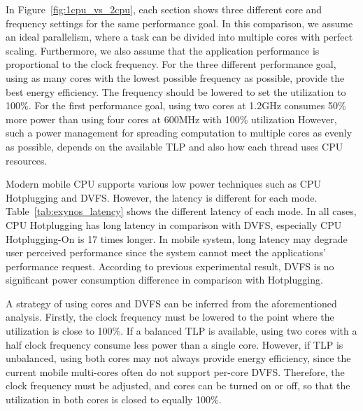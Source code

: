 In Figure~\ref{fig:1cpu_vs_2cpu}, each section shows three different core and frequency settings
for the same performance goal. In this comparison, we assume an ideal parallelism, where
a task can be divided into multiple cores with perfect scaling. Furthermore, we also assume
that the application performance is proportional to the clock frequency.
For the three different performance goal, using as many cores with the lowest possible
frequency as possible, provide the best energy efficiency. The frequency should be 
lowered to set the utilization to 100\%. For the first performance goal,
using two cores at 1.2GHz consumes 50\% more power than using four cores at 600MHz with
100\% utilization 
However, such a power management for spreading computation to multiple cores as evenly as possible, depends
on the available TLP and also how each thread uses CPU resources. 

Modern mobile CPU supports various low power techniques such as CPU Hotplugging and DVFS.
However, the latency is different for each mode. 
Table~\ref{tab:exynos_latency} shows the different latency of each mode.
In all cases, CPU Hotplugging has long latency in comparison with DVFS, 
especially CPU Hotplugging-On is 17 times longer. 
In mobile system, long latency may degrade user perceived performance 
since the system cannot meet the applications' performance request. 
According to previous experimental result, 
DVFS is no significant power consumption difference in comparison with Hotplugging.



A strategy of using cores and DVFS can be inferred from the aforementioned analysis.
Firstly, the clock frequency must be lowered to the point where the utilization is close to 100\%.
If a balanced TLP is available, using two cores with a half clock frequency consume less power than
a single core. However, if TLP is unbalanced, using both cores may not always provide energy
efficiency, since the current mobile multi-cores often do not support per-core DVFS. Therefore,
the clock frequency must be adjusted, and cores can be turned on or off, so that
the utilization in both cores is closed to equally 100\%.

